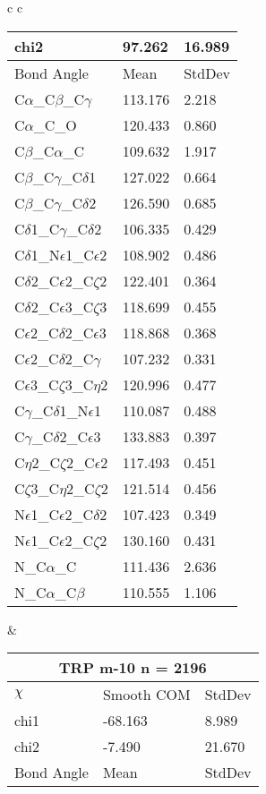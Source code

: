 \begin{longtable}{ c c }
\begin{tabular}{ l l l }
  chi2 & 97.262 & 16.989 \\ \midrule
  Bond Angle   & Mean     & StdDev \\ \midrule
  C$\alpha$\_C$\beta$\_C$\gamma$ & 113.176 & 2.218\\
  C$\alpha$\_C\_O & 120.433 & 0.860\\
  C$\beta$\_C$\alpha$\_C & 109.632 & 1.917\\
  C$\beta$\_C$\gamma$\_C$\delta$1 & 127.022 & 0.664\\
  C$\beta$\_C$\gamma$\_C$\delta$2 & 126.590 & 0.685\\
  C$\delta$1\_C$\gamma$\_C$\delta$2 & 106.335 & 0.429\\
  C$\delta$1\_N$\epsilon$1\_C$\epsilon$2 & 108.902 & 0.486\\
  C$\delta$2\_C$\epsilon$2\_C$\zeta$2 & 122.401 & 0.364\\
  C$\delta$2\_C$\epsilon$3\_C$\zeta$3 & 118.699 & 0.455\\
  C$\epsilon$2\_C$\delta$2\_C$\epsilon$3 & 118.868 & 0.368\\
  C$\epsilon$2\_C$\delta$2\_C$\gamma$ & 107.232 & 0.331\\
  C$\epsilon$3\_C$\zeta$3\_C$\eta$2 & 120.996 & 0.477\\
  C$\gamma$\_C$\delta$1\_N$\epsilon$1 & 110.087 & 0.488\\
  C$\gamma$\_C$\delta$2\_C$\epsilon$3 & 133.883 & 0.397\\
  C$\eta$2\_C$\zeta$2\_C$\epsilon$2 & 117.493 & 0.451\\
  C$\zeta$3\_C$\eta$2\_C$\zeta$2 & 121.514 & 0.456\\
  N$\epsilon$1\_C$\epsilon$2\_C$\delta$2 & 107.423 & 0.349\\
  N$\epsilon$1\_C$\epsilon$2\_C$\zeta$2 & 130.160 & 0.431\\
  N\_C$\alpha$\_C & 111.436 & 2.636\\
  N\_C$\alpha$\_C$\beta$ & 110.555 & 1.106\\
  \bottomrule
  \end{tabular}
  &
  \begin{tabular}{ l l l }
  \toprule
  \multicolumn{3}{c}{TRP \textbf{m-10} n = 2196} \\ \toprule
  $\chi$       & Smooth COM & StdDev \\ \midrule
  chi1 & -68.163 & 8.989 \\ 
  chi2 & -7.490 & 21.670 \\ \midrule
  Bond Angle   & Mean     & StdDev \\ \midrule

\end{tabular}
\end{longtable}
